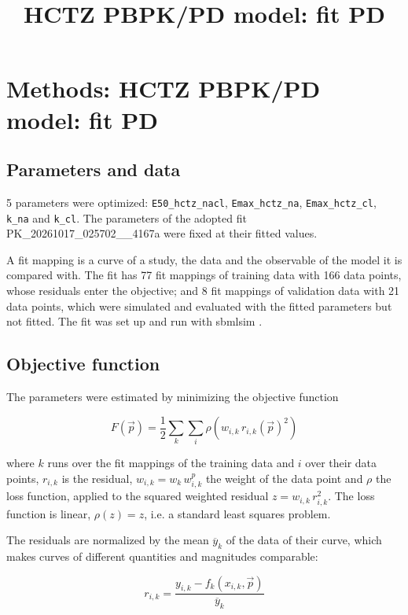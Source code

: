 \documentclass{article}
\title{HCTZ PBPK/PD model: fit PD}
\date{}
\begin{document}
\maketitle

\section{Methods: HCTZ PBPK/PD model: fit PD}

\subsection{Parameters and data}

5 parameters were optimized: \texttt{E50\_hctz\_nacl}, \texttt{Emax\_hctz\_na}, \texttt{Emax\_hctz\_cl}, \texttt{k\_na} and \texttt{k\_cl}. The parameters of the adopted fit PK\_20261017\_025702\_\_4167a were fixed at their fitted values.

A fit mapping is a curve of a study, the data and the observable of the model it is compared with. The fit has 77 fit mappings of training data with 166 data points, whose residuals enter the objective; and 8 fit mappings of validation data with 21 data points, which were simulated and evaluated with the fitted parameters but not fitted. The fit was set up and run with sbmlsim \cite{Koenig2026_sbmlsim}.

\subsection{Objective function}

The parameters were estimated by minimizing the objective function

\begin{equation}
F(\vec{p}) = \frac{1}{2} \sum_{k} \sum_{i} \rho\left(w_{i,k}\, r_{i,k}(\vec{p})^2\right)
\end{equation}

where $k$ runs over the fit mappings of the training data and $i$ over their data points, $r_{i,k}$ is the residual, $w_{i,k} = w_k\, w^{p}_{i,k}$ the weight of the data point and $\rho$ the loss function, applied to the squared weighted residual $z = w_{i,k}\, r_{i,k}^2$. The loss function is linear, $\rho(z) = z$, i.e. a standard least squares problem.

The residuals are normalized by the mean $\overline{y}_k$ of the data of their curve, which makes curves of different quantities and magnitudes comparable:

\begin{equation}
r_{i,k} = \frac{y_{i,k} - f_k(x_{i,k}, \vec{p})}{\overline{y}_k}
\end{equation}
\end{document}
